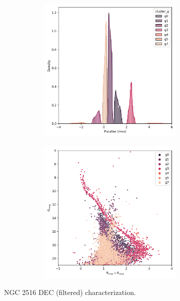 \documentclass[11pt, a4paper, english]{book}
\begin{document}
\begin{figure}[H]
\begin{subfigure}{0.9\textwidth}
\begin{subfigure}[t]{0.30\textwidth}
    \end{subfigure}
    \hfill
    \begin{subfigure}[t]{0.30\textwidth}
      \centering
      \includegraphics[width=\textwidth]{../figures/ngc_2516/dec_parallax_filtered_ngc_2516.png}
    \end{subfigure}
    \hfill
    \begin{subfigure}[t]{0.30\textwidth}
      \centering
      \includegraphics[width=\textwidth]{../figures/ngc_2516/dec_hr_diagram_filtered_ngc_2516.png}
    \end{subfigure}
  \end{subfigure}
  \caption{NGC 2516 DEC (filtered) characterization.}
\end{figure}
\end{document}
